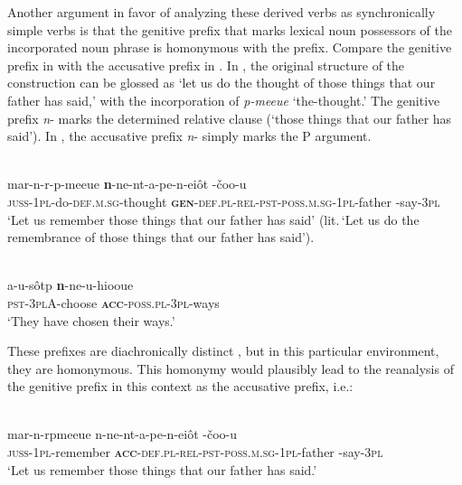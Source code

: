 \documentclass[output=paper]{LSP/langsci}
\begin{document}
 Another argument in favor of analyzing these derived verbs as synchronically simple verbs is that the genitive prefix that marks lexical noun possessors of the incorporated noun phrase is homonymous with the  prefix. Compare the genitive prefix in  with the accusative prefix in . In , the original structure of the construction can be glossed as ‘let us do the thought of those things that our father has said,’ with the incorporation of \textit{p-meeue} ‘the-thought.’ The genitive prefix \textit{n}- marks the determined relative clause (‘those things that our father has said’). In , the accusative prefix \textit{n}- simply marks the P argument.

\begin{exe}
\ex%
\label{05-gr-ex:47}
\\
\gll mar-n-r-p-meeue \textbf{n}-ne-nt-a-pe-n-eiôt -čoo-u\\
\textsc{juss-1pl}-do-\textsc{def.m.sg}-thought \textbf{\textsc{gen}}-\textsc{def.pl-rel-pst-poss.m.sg-1pl}-father -say-\textsc{3pl}\\
\glt ‘Let us remember those things that our father has said’ (lit.\,‘Let us do the remembrance of those things that our father has said’).
\end{exe}

\begin{exe}
\ex%
\label{05-gr-ex:48}
\\
\gll a-u-sôtp \textbf{n}-ne-u-hiooue\\
\textsc{pst-3pl}A-choose \textbf{\textsc{acc}}\textsc{-poss.pl-3pl}-ways\\
\glt ‘They have chosen their ways.’ %
\end{exe}

These prefixes are diachronically distinct \citep{Winand2015Expression}, but in this particular environment, they are homonymous. This homonymy would plausibly lead to the reanalysis of the genitive prefix in this context as the accusative prefix, i.e.:

\begin{exe}
\ex%
\label{05-gr-ex:49}
\\
\gll mar-n-rpmeeue  n-ne-nt-a-pe-n-eiôt -čoo-u\\
\textsc{juss-1pl}-remember \textbf{\textsc{acc}}-\textsc{def.pl-rel-pst-poss.m.sg-1pl}-father -say-\textsc{3pl}\\
\glt ‘Let us remember those things that our father has said.’
\end{exe}
\end{document}
